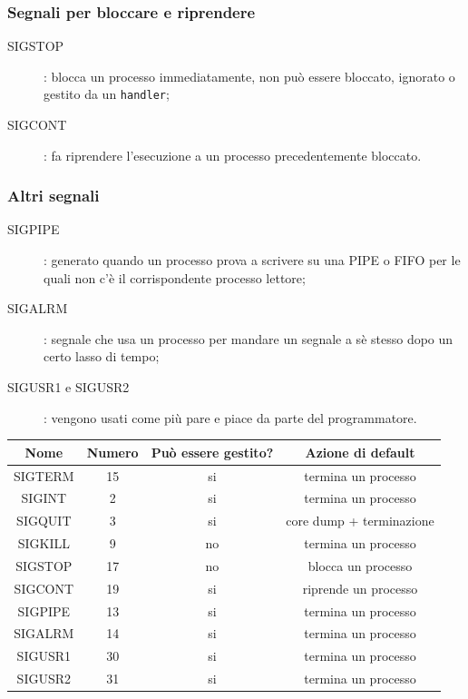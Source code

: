 \documentclass[a4paper, 12pt]{book}
\begin{document}
    \subsubsection{Segnali per bloccare e riprendere}

    \begin{description}
        \item[SIGSTOP]: blocca un processo immediatamente, non può essere bloccato, ignorato o gestito da un \verb|handler|;
        \item[SIGCONT]: fa riprendere l'esecuzione a un processo precedentemente bloccato.
    \end{description}

    \subsubsection{Altri segnali}

    \begin{description}
        \item[SIGPIPE]: generato quando un processo prova a scrivere su una PIPE o FIFO per le quali non c'è il corrispondente processo lettore;
        \item[SIGALRM]: segnale che usa un processo per mandare un segnale a sè stesso dopo un certo lasso di tempo;
        \item[SIGUSR1 e SIGUSR2]: vengono usati come più pare e piace da parte del programmatore.
    \end{description}

    \begin{center}
        \begin{tabular}{|c|c|c|c|}
            \hline 
            Nome & Numero & Può essere gestito? & Azione di default \\
            \hline 
            SIGTERM & 15 & si & termina un processo \\
            SIGINT & 2 & si & termina un processo \\
            SIGQUIT & 3 & si & core dump + terminazione \\
            SIGKILL & 9 & no & termina un processo \\
            SIGSTOP & 17 & no & blocca un processo \\
            SIGCONT & 19 & si & riprende un processo \\
            SIGPIPE & 13 & si & termina un processo \\
            SIGALRM & 14 & si & termina un processo \\
            SIGUSR1 & 30 & si & termina un processo \\
            SIGUSR2 & 31 & si & termina un processo \\
            \hline 
        \end{tabular}
    \end{center}
\end{document}
